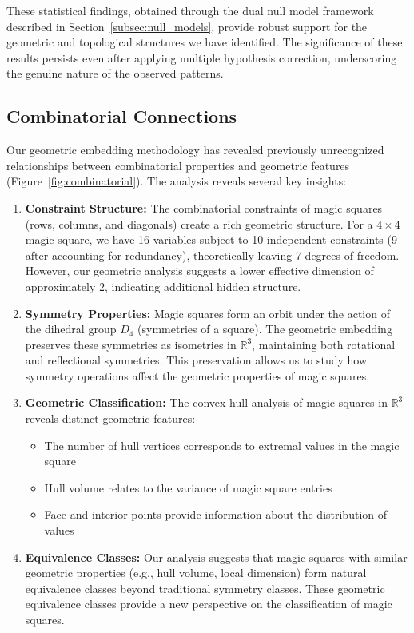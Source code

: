 These statistical findings, obtained through the dual null model framework described in Section~\ref{subsec:null_models}, provide robust support for the geometric and topological structures we have identified. The significance of these results persists even after applying multiple hypothesis correction, underscoring the genuine nature of the observed patterns.

\subsection{Combinatorial Connections}
\label{subsec:combinatorial}

Our geometric embedding methodology has revealed previously unrecognized relationships between combinatorial properties and geometric features (Figure~\ref{fig:combinatorial}). The analysis reveals several key insights:

\begin{enumerate}
    \item \textbf{Constraint Structure:} The combinatorial constraints of magic squares (rows, columns, and diagonals) create a rich geometric structure. For a $4 \times 4$ magic square, we have 16 variables subject to 10 independent constraints (9 after accounting for redundancy), theoretically leaving 7 degrees of freedom. However, our geometric analysis suggests a lower effective dimension of approximately 2, indicating additional hidden structure.
    
    \item \textbf{Symmetry Properties:} Magic squares form an orbit under the action of the dihedral group $D_4$ (symmetries of a square). The geometric embedding preserves these symmetries as isometries in $\mathbb{R}^3$, maintaining both rotational and reflectional symmetries. This preservation allows us to study how symmetry operations affect the geometric properties of magic squares.
    
    \item \textbf{Geometric Classification:} The convex hull analysis of magic squares in $\mathbb{R}^3$ reveals distinct geometric features:
    \begin{itemize}
        \item The number of hull vertices corresponds to extremal values in the magic square
        \item Hull volume relates to the variance of magic square entries
        \item Face and interior points provide information about the distribution of values
    \end{itemize}
    
    \item \textbf{Equivalence Classes:} Our analysis suggests that magic squares with similar geometric properties (e.g., hull volume, local dimension) form natural equivalence classes beyond traditional symmetry classes. These geometric equivalence classes provide a new perspective on the classification of magic squares.
\end{enumerate}

